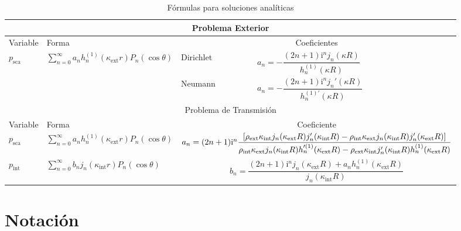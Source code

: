 \documentclass[11pt]{article}
\numberwithin{equation}{section}
\let\i\relax
\def\i{\mathrm{i}}
\def\exterior{\textrm{ext}}
\def\interior{\textrm{int}}
\def\sca{\textrm{sca}}
\begin{document}
\begin{table}[H]
\centering
\begin{tabular}{ |p{1cm}|p{4cm}|p{2cm}|p{4cm}|  }
	\hline
	\multicolumn{4}{|c|}{Problema Exterior} \\
	\hline
	Variable & Forma & \multicolumn{2}{|c|}{Coeficientes} \\
	\hline
	\multirow{2}{2cm}{ \(p_{\sca}\) }
	& 
	\multirow{2}{2cm}{ \(\sum_{n=0}^{\infty} a_n h^{(1)}_{n}(\kappa_{\exterior} r) P_{n}(\cos\theta)\) }
	&
	Dirichlet& \(a_n = -\dfrac{(2n+1)\i^n j_n(\kappa R)}{h^{(1)}_{n}(\kappa R)}\) \\[1em]
	\cline{3-4}
	&&
	Neumann& \( a_n = -\dfrac{(2n+1) \i^n j_n'(\kappa R)}{h^{(1)'}_{n}(\kappa R)}\)
	\\[1em]
	\hline
	\multicolumn{4}{|c|}{Problema de Transmisión} \\
	\hline
	Variable & Forma & \multicolumn{2}{|c|}{Coeficiente} \\
	\hline
	\(p_{\sca}\)
	& 
	\(\sum_{n=0}^{\infty} a_n h^{(1)}_{n}(\kappa_{\exterior} r) P_{n}(\cos\theta)\)
	&
	\multicolumn{2}{|c|}{\(
	a_{n} =
	(2n+1) \i^n
	\dfrac
	{%
		\left[
			\rho_{\exterior} \kappa_{\interior}
			j_n(\kappa_{\exterior} R)
			j'_{n}(\kappa_{\interior} R)
			-
			\rho_{\interior} \kappa_{\exterior}
			j_{n}(\kappa_{\interior} R)
			j'_{n}(\kappa_{\exterior} R)
		\right]
	}
	{%
		\rho_{\interior} \kappa_{\exterior}
		j_{n}(\kappa_{\interior} R)
		h'^{(1)}_{n}(\kappa_{\exterior} R)
		-
		\rho_{\exterior} \kappa_{\interior}
		j'_{n}(\kappa_{\interior} R)
		h^{(1)}_{n}(\kappa_{\exterior} R)
	}\)
	} \\[1em]
	\hline
	\(p_{\interior}\)
	&
	\( \sum_{n=0}^{\infty} b_n j_{n}(\kappa_{\interior} r) P_{n}(\cos\theta) \)
	&
	\multicolumn{2}{|c|}{\(
	b_n =
	\dfrac
	{
		(2n + 1) \i^n j_n(\kappa_{\exterior} R) 
		+ 
		a_{n} h^{(1)}_{n} (\kappa_{\exterior} R)
	}
	{
		j_{n}(\kappa_{\interior} R)
	}
	\)}\\[1em]
	\hline
\end{tabular}
\caption{Fórmulas para soluciones analíticas}
\end{table}

\appendix

\restoregeometry

\section{Notación}\label{ap:notacion}
\end{document}
